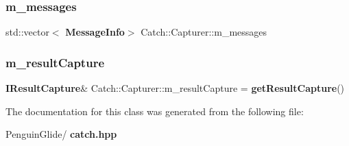 \mbox{\label{class_catch_1_1_capturer_aefa14693d28906e5e7b06975af38aaed}} 
\subsubsection{m\_messages}
{\footnotesize\ttfamily std\+::vector$<$\textbf{ Message\+Info}$>$ Catch\+::\+Capturer\+::m\+\_\+messages\hspace{0.3cm}{\ttfamily [private]}}

\mbox{\label{class_catch_1_1_capturer_a29edecce81d56837945ba2585c0ff941}} 
\subsubsection{m\_resultCapture}
{\footnotesize\ttfamily \textbf{ I\+Result\+Capture}\& Catch\+::\+Capturer\+::m\+\_\+result\+Capture = \textbf{ get\+Result\+Capture}()\hspace{0.3cm}{\ttfamily [private]}}



The documentation for this class was generated from the following file\+:\begin{DoxyCompactItemize}
\item 
Penguin\+Glide/\textbf{ catch.\+hpp}\end{DoxyCompactItemize}
